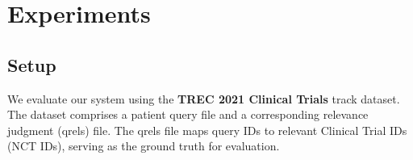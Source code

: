 \documentclass[11pt]{article}
\begin{document}


\section{Experiments}

\subsection{Setup}
We evaluate our system using the \textbf{TREC 2021 Clinical Trials} track dataset. The dataset comprises a patient query file and a corresponding relevance judgment (qrels) file. The qrels file maps query IDs to relevant Clinical Trial IDs (NCT IDs), serving as the ground truth for evaluation.
\end{document}
